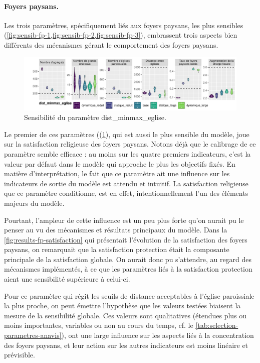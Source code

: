 \paragraph{Foyers paysans.}
Les trois paramètres, spécifiquement liés aux foyers paysans, les plus sensibles (\cref{fig:sensib-fp-1,fig:sensib-fp-2,fig:sensib-fp-3}), embrassent trois aspects bien différents des mécanismes gérant le comportement des foyers paysans.

\begin{figure}[H]
	\centering
	\includegraphics[width=\linewidth]{img/sensib/sensibilite_dist_minmax_eglise.pdf}
	\caption{Sensibilité du paramètre \textsf{dist\_minmax\_eglise}.}
	\label{fig:sensib-fp-1}
\end{figure}

Le premier de ces paramètres ((\cref{fig:sensib-fp-1}), qui est aussi le plus sensible du modèle, joue sur la satisfaction religieuse des foyers paysans.
Notons déjà que le calibrage de ce paramètre semble efficace : au moins sur les quatre premiers indicateurs, c'est la valeur par défaut dans le modèle qui approche le plus les objectifs fixés.
En matière d'interprétation, le fait que ce paramètre ait une influence sur les indicateurs de sortie du modèle est attendu et intuitif.
La satisfaction religieuse que ce paramètre conditionne, est en effet, intentionnellement l'un des éléments majeurs du modèle.

Pourtant, l'ampleur de cette influence est un peu plus forte qu'on aurait pu le penser au vu des mécanismes et résultats principaux du modèle.
Dans la \cref{fig:results-fp-satisfaction} qui présentait l'évolution de la satisfaction des foyers paysans, on remarquait que la satisfaction protection était la composante principale de la satisfaction globale.
On aurait donc pu s'attendre, au regard des mécanismes implémentés, à ce que les paramètres liés à la satisfaction protection aient une sensibilité supérieure à celui-ci.

Pour ce paramètre qui régit les seuils de distance acceptables à l'église paroissiale la plus proche, on peut émettre l'hypothèse que les valeurs testées biaisent la mesure de la sensibilité globale.
Ces valeurs sont qualitatives (étendues plus ou moins importantes, variables ou non au cours du temps, cf. le \cref{tab:selection-parametres-anavis}), ont une large influence sur les aspects liés à la concentration des foyers paysans, et leur action sur les autres indicateurs est moins linéaire et prévisible.

